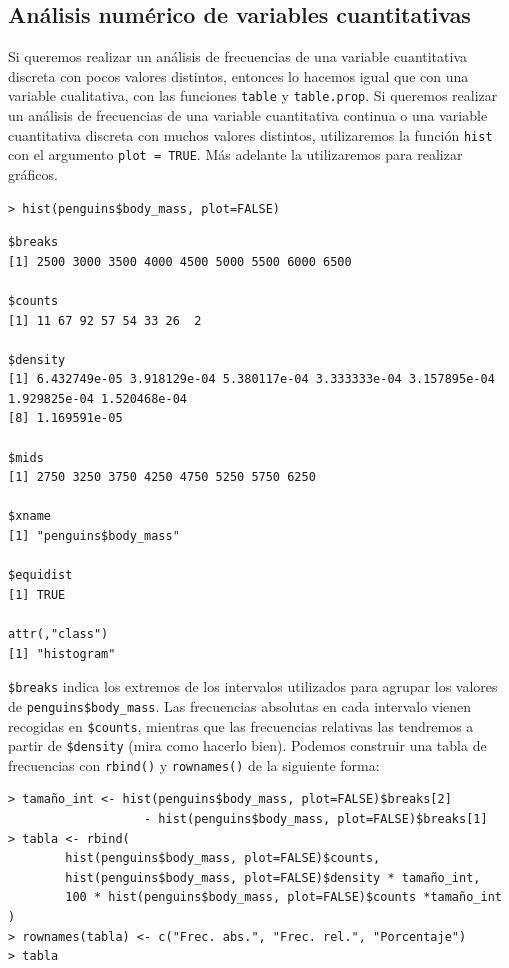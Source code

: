 \documentclass[11pt,a4paper]{article}
\theoremstyle{exercise}
\begin{document}
\subsection{Análisis numérico de variables cuantitativas}

Si queremos realizar un análisis de frecuencias de una variable cuantitativa discreta con pocos valores distintos, entonces lo hacemos igual que con una variable cualitativa, con las funciones \texttt{table} y \texttt{table.prop}. Si queremos realizar un análisis de frecuencias de una variable cuantitativa continua o una variable cuantitativa discreta con muchos valores distintos, utilizaremos la función \texttt{hist} con el argumento \texttt{plot = TRUE}. Más adelante la utilizaremos para realizar gráficos.

\begin{lstlisting}[style=rconsole]
> hist(penguins$body_mass, plot=FALSE)
\end{lstlisting}
\begin{lstlisting}[style=routput]
$breaks
[1] 2500 3000 3500 4000 4500 5000 5500 6000 6500

$counts
[1] 11 67 92 57 54 33 26  2

$density
[1] 6.432749e-05 3.918129e-04 5.380117e-04 3.333333e-04 3.157895e-04 1.929825e-04 1.520468e-04
[8] 1.169591e-05

$mids
[1] 2750 3250 3750 4250 4750 5250 5750 6250

$xname
[1] "penguins$body_mass"

$equidist
[1] TRUE

attr(,"class")
[1] "histogram"
\end{lstlisting}

\verb|$breaks| indica los extremos de los intervalos utilizados para agrupar los valores de \verb|penguins$body_mass|. Las frecuencias absolutas en cada intervalo vienen recogidas en \verb|$counts|, mientras que las frecuencias relativas las tendremos a partir de \verb|$density| (mira como hacerlo bien). Podemos construir una tabla de frecuencias con \verb|rbind()| y \verb|rownames()| de la siguiente forma:
\begin{lstlisting}[style=rconsole]
> tamaño_int <- hist(penguins$body_mass, plot=FALSE)$breaks[2]
                   - hist(penguins$body_mass, plot=FALSE)$breaks[1]
> tabla <- rbind(
		hist(penguins$body_mass, plot=FALSE)$counts,
		hist(penguins$body_mass, plot=FALSE)$density * tamaño_int,
		100 * hist(penguins$body_mass, plot=FALSE)$counts *tamaño_int
)			
> rownames(tabla) <- c("Frec. abs.", "Frec. rel.", "Porcentaje")
> tabla
\end{lstlisting}
\end{document}
